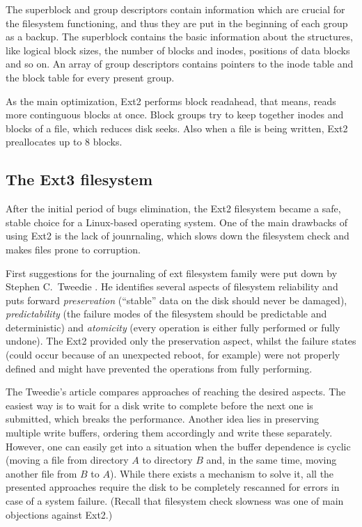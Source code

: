 \documentclass{acm_proc_article-sp}
\begin{document}
The superblock and group descriptors contain information which are crucial for the filesystem functioning, and thus they are put in the beginning of each group as a backup. The superblock contains the basic information about the structures, like logical block sizes, the number of blocks and inodes, positions of data blocks and so on. An array of group descriptors contains pointers to the inode table and the block table for every present group.

As the main optimization, Ext2 performs block readahead, that means, reads more continguous blocks at once. Block groups try to keep together inodes and blocks of a file, which reduces disk seeks. Also when a file is being written, Ext2 preallocates up to 8 blocks.

\subsection{The Ext3 filesystem}

After the initial period of bugs elimination, the Ext2 filesystem became a safe, stable choice for a Linux-based operating system. One of the main drawbacks of using Ext2 is the lack of jounrnaling, which slows down the filesystem check and makes files prone to corruption.

First suggestions for the journaling of ext filesystem family were put down by Stephen C.\ Tweedie \cite{extjournal}. He identifies several aspects of filesystem reliability and puts forward {\it preservation} (``stable'' data on the disk should never be damaged), {\it predictability} (the failure modes of the filesystem should be predictable and deterministic) and {\it atomicity} (every operation is either fully performed or fully undone). The Ext2 provided only the preservation aspect, whilst the failure states (could occur because of an unexpected reboot, for example) were not properly defined and might have prevented the operations from fully performing.

The Tweedie's article \cite{extjournal} compares approaches of reaching the desired aspects. The easiest way is to wait for a disk write to complete before the next one is submitted, which breaks the performance. Another idea lies in preserving multiple write buffers, ordering them accordingly and write these separately. However, one can easily get into a situation when the buffer dependence is cyclic (moving a file from directory $A$ to directory $B$ and, in the same time, moving another file from $B$ to $A$). While there exists a mechanism to solve it, all the presented approaches require the disk to be completely rescanned for errors in case of a system failure. (Recall that filesystem check slowness was one of main objections against Ext2.)
\end{document}
